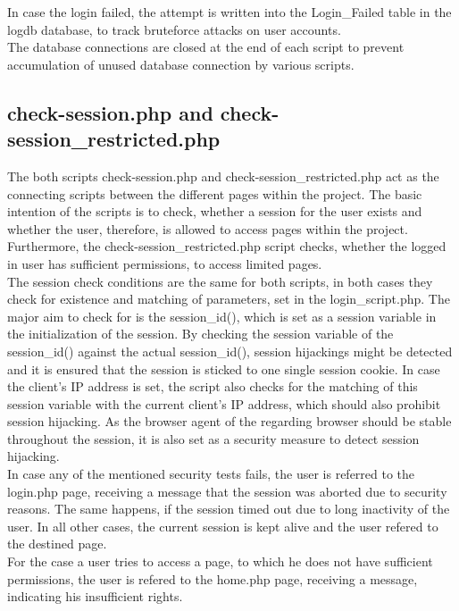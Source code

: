 In case the login failed, the attempt is written into the Login\_Failed table in the logdb database, to track bruteforce attacks on user accounts.\\
The database connections are closed at the end of each script to prevent accumulation of unused database connection by various scripts.

\subsection{check-session.php and check-session\_restricted.php}
The both scripts check-session.php and check-session\_restricted.php act as the connecting scripts between the different pages within the project. The basic intention of the scripts is to check, whether a session for the user exists and whether the user, therefore, is allowed to access pages within the project. Furthermore, the check-session\_restricted.php script checks, whether the logged in user has sufficient 
permissions, to access limited pages.\\ 
The session check conditions are the same for both scripts, in both cases they check for existence and matching of parameters, set in the login\_script.php. The major aim to check for is the session\_id(), which is set as a session variable in the initialization of the session. By checking the session variable of the session\_id() against the actual session\_id(), session hijackings might be detected and it is ensured that the session is sticked to one single session cookie. In case the client's IP address is set, the script also checks for the matching of this session variable with the current client's IP address, which should also prohibit session hijacking. As the browser agent of the regarding browser should be stable throughout the session, it is also set as a security measure to detect session hijacking.\\
In case any of the mentioned security tests fails, the user is referred to the login.php page, receiving a message that the session was aborted due to security reasons. The same happens, if the session timed out due to long inactivity of the user. In all other cases, the current session is kept alive and the user refered to the destined page.\\
For the case a user tries to access a page, to which he does not have sufficient permissions, the user is refered to the home.php page, receiving a message, indicating his insufficient rights.
